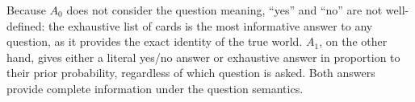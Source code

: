 \documentclass[12pt, floatsintext, jou]{apa6}
\begin{document}


Because $A_0$ does not consider the question meaning, ``yes'' and ``no'' are not well-defined: the exhaustive list of cards is the most informative answer to any question, as it provides the exact identity of the true world. $A_1$, on the other hand, gives either a literal yes/no answer or exhaustive answer in proportion to their prior probability, regardless of which question is asked. Both answers provide complete information under the question semantics.
\end{document}
